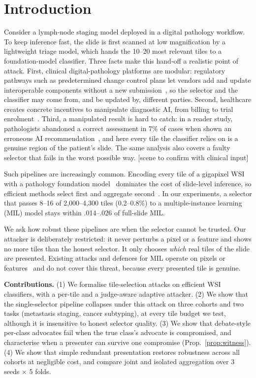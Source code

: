\documentclass[runningheads]{llncs}
\newcommand{\inprog}[1]{{\color{blue}[#1]}}
\begin{document}
\section{Introduction}
Consider a lymph-node staging model deployed in a digital pathology workflow. To keep inference fast, the slide is first scanned at low magnification by a lightweight triage model, which hands the 10--20 most relevant tiles to a foundation-model classifier. Three facts make this hand-off a realistic point of attack. First, clinical digital-pathology platforms are modular: regulatory pathways such as predetermined change control plans let vendors add and update interoperable components without a new submission~\cite{fda2024pccp}, so the selector and the classifier may come from, and be updated by, different parties. Second, healthcare creates concrete incentives to manipulate diagnostic AI, from billing to trial enrolment~\cite{finlayson2019adversarial}. Third, a manipulated result is hard to catch: in a reader study, pathologists abandoned a correct assessment in 7\% of cases when shown an erroneous AI recommendation~\cite{rosbach2024automation}, and here every tile the classifier relies on is a genuine region of the patient's slide. The same analysis also covers a faulty selector that fails in the worst possible way. \inprog{scene to confirm with clinical input}

Such pipelines are increasingly common. Encoding every tile of a gigapixel WSI with a pathology foundation model~\cite{uni,conch} dominates the cost of slide-level inference, so efficient methods select first and aggregate second~\cite{thandiackal2022zoommil,zhao2023rlogist,admil2026,eagle2026}. In our experiments, a selector that passes 8--16 of 2,000--4,300 tiles (0.2--0.8\%) to a multiple-instance learning (MIL) model stays within .014--.026 of full-slide MIL.

We ask how robust these pipelines are when the selector cannot be trusted. Our attacker is deliberately restricted: it never perturbs a pixel or a feature and shows no more tiles than the honest selector. It only chooses \emph{which} real tiles of the slide are presented. Existing attacks and defences for MIL operate on pixels or features~\cite{foote2021now,mil_adv2022} and do not cover this threat, because every presented tile is genuine.

\textbf{Contributions.} (1) We formalise tile-selection attacks on efficient WSI classifiers, with a per-tile and a judge-aware adaptive attacker. (2) We show that the single-selector pipeline collapses under this attack on three cohorts and two tasks (metastasis staging, cancer subtyping), at every tile budget we test, although it is insensitive to honest selector quality. (3) We show that debate-style per-class advocates fail when the true class's advocate is compromised, and characterise when a presenter can survive one compromise (Prop.~\ref{prop:witness}). (4) We show that simple redundant presentation restores robustness across all cohorts at negligible cost, and compare joint and isolated aggregation over 3 seeds $\times$ 5 folds.
\end{document}
